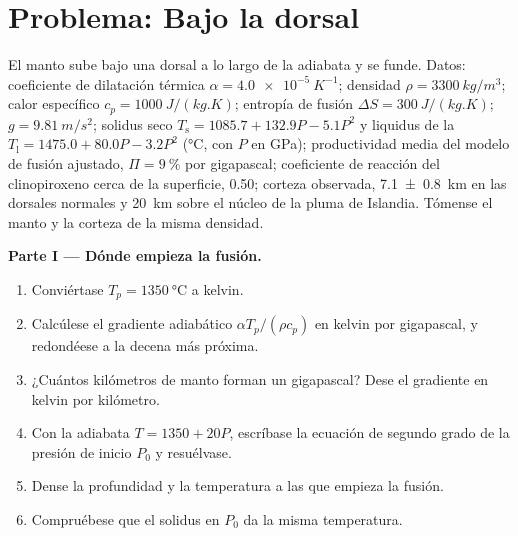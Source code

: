 \section{Problema: Bajo la dorsal}

\begin{problem}
\label{pb:b2:mantle-melting:1}
El manto sube bajo una dorsal a lo largo de la adiabata y se funde. Datos: coeficiente de
dilatación térmica $\alpha = \qty{4.0e-5}{K^{-1}}$; densidad $\rho = \qty{3300}{kg/m^3}$;
calor específico $c_p = \qty{1000}{J/(kg.K)}$; entropía de fusión $\Delta S =
\qty{300}{J/(kg.K)}$; $g = \qty{9.81}{m/s^2}$; solidus seco $T_{\mathrm s} =
1085.7 + 132.9P - 5.1P^2$ y liquidus de la  $T_{\mathrm l} = 1475.0 +
80.0P - 3.2P^2$ (\unit{\celsius}, con $P$ en \unit{GPa}); productividad media del
modelo de fusión ajustado, $\Pi = \qty{9}{\percent}$ por gigapascal; coeficiente de reacción del
clinopiroxeno cerca de la superficie, 0.50; corteza observada, \qty[uncertainty-mode=separate]{7.1 \pm 0.8}{km}
en las dorsales normales y \qty{20}{km} sobre el núcleo de la pluma de Islandia. Tómense el manto
y la corteza de la misma densidad.

\noindent\textbf{Parte I --- Dónde empieza la fusión.}
\begin{enumerate}
\item Conviértase $T_p = \qty{1350}{\celsius}$ a kelvin.
\item Calcúlese el gradiente adiabático $\alpha T_p/(\rho c_p)$ en kelvin por
gigapascal, y redondéese a la decena más próxima.
\item ¿Cuántos kilómetros de manto forman un gigapascal? Dese el gradiente en
kelvin por kilómetro.
\item Con la adiabata $T = 1350 + 20P$, escríbase la ecuación de segundo grado de la presión de inicio
$P_0$ y resuélvase.
\item Dense la profundidad y la temperatura a las que empieza la fusión.
\item Compruébese que el solidus en $P_0$ da la misma temperatura.
\end{enumerate}


\end{problem}
